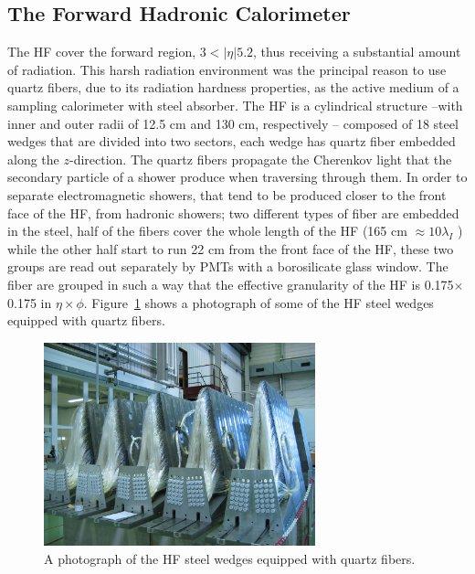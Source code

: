 \subsection{The Forward Hadronic Calorimeter}
The HF cover the forward region, $3 < |\eta| 5.2$, thus receiving a
substantial amount of radiation. This harsh radiation environment was
the principal reason to use quartz fibers, due to its radiation
hardness properties, as the active medium of a
sampling calorimeter with steel absorber. The HF is a cylindrical
structure --with inner and outer radii of 12.5 cm and 130 cm, respectively -- composed of 18
steel wedges that are divided into two sectors, each wedge has quartz
fiber embedded along the $z$-direction. The quartz fibers propagate
the Cherenkov light that the secondary particle of a shower produce
when traversing through them. In order to separate electromagnetic
showers, that tend to be produced closer to the front face of the HF,
from hadronic showers; two different types of fiber are embedded in
the steel, half of the fibers cover the whole length of the HF (165 cm
$\approx 10\lambda_{I}$ ) while the other half start to run 22 cm from
the front face of the HF, these two groups are read out
separately by PMTs with a borosilicate glass window. The fiber are grouped in such a way that the effective
granularity of the HF is 0.175$\times$0.175 in
$\eta\times\phi$. Figure~\ref{fig:HF_photo} shows a photograph of some
of the HF steel wedges equipped with quartz fibers.
\begin{figure}
 \centering
\includegraphics[width=0.7\textwidth]{CMS_DetectorFigures/HF_cal.jpg}
\caption{A photograph of the HF steel wedges equipped with quartz fibers.\label{fig:HF_photo}}
\end{figure}

